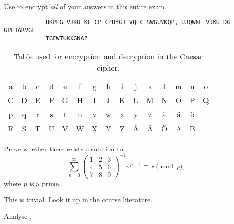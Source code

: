 \documentclass[a4paper,addpoints]{miunexam}
\begin{document}
\begin{questions}
	\question[10]
	Use  to encrypt \emph{all} of your answers in this
	entire exam.

	\begin{solution}
		\begin{verbatim}
			UKPEG VJKU KU CP CPUYGT VQ C SWGUVKQP, UJQWNF VJKU DG GPETARVGF
			TGEWTUKXGNA?
		\end{verbatim}
	\end{solution}

	\begin{table}[p]
		\centering
		\begin{tabular}{ccccccccccccccc}
			\hline\hline
			a & b & c & d & e & f & g & h & i & j & k & l & m & n & o \\
			C & D & E & F & G & H & I & J & K & L & M & N & O & P & Q \\
			\hline\hline
			p & q & r & s & t & u & v & w & x & y & z & å & ä & ö \\
			R & S & T & U & V & W & X & Y & Z & Å & Ä & Ö & A & B \\
			\hline\hline
		\end{tabular}
		\caption{Table used for encryption and decryption in the Caesar cipher.}
		\label{tbl:Caesar}
	\end{table}

	\question[2]
	Prove whether there exists a solution to
	.
	\begin{equation}
		\label{eq:AnalyticalNumberTheory}
		\sum_{n=0}^\infty \left(
			\begin{array}{ccc}
				1 & 2 & 3 \\
				4 & 5 & 6 \\
				7 & 8 & 9
			\end{array}\right)^{-1}n^{p-1} \equiv x \pmod{p},
	\end{equation}
	where \(p\) is a prime.
	\begin{solution}
		This is trivial.
		Look it up in the course literature.
	\end{solution}

	\question[2]
	Analyse .
\end{questions}
\end{document}
